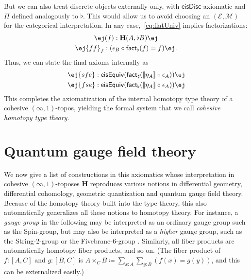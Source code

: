 \documentclass[copyright]{eptcs}
\makeatletter
\newcommand{\type}{\ensuremath{\mathsf{Type}}\xspace}
\renewcommand{\H}{\ensuremath{\mathbf{H}}\xspace}
\newcommand{\io}{\ensuremath{(\infty,1)}}
\newcommand{\E}{\ensuremath{\mathcal{E}}\xspace}
\newcommand{\M}{\ensuremath{\mathcal{M}}\xspace}
\newcommand{\factsharp}{\textsf{fact}_{\sharp}}
\newcommand{\factflat}{\textsf{fact}_{\flat}}
\def\jd#1{\@jd#1\ej}
\def\@jd#1|-#2\ej{\@@jd#1,,\;\vdash\;\left(#2\right)}
\def\@@jd#1,{\@ifmtarg{#1}{\let\next=\relax}{\left(#1\right)\let\next=\@@@jd}\next}
\def\@@@jd#1,{\@ifmtarg{#1}{\let\next=\relax}{,\,\left(#1\right)\let\next=\@@@jd}\next}
\makeatother
\begin{document}
But we can also treat discrete objects externally only, with $\mathsf{eisDisc}$ axiomatic and $\Pi$ defined analogously to $\flat$.
This would allow us %
to avoid choosing an $(\E,\M)$ for the categorical interpretation.
In any case,~\eqref{eq:flatUniv} implies factorizations:
\begin{gather*}
  \jd{\mathsf{ad}:\mathsf{eisDisc}(A), f:{\H(A,B)} |- \factflat(f):{\H(A,\flat B)}} \\
  \jd{\mathsf{ad}:\mathsf{eisDisc}(A), f:{\H(A,B)} |- \mathsf{ff}_f:(\epsilon_B \circ \factflat(f) = f)}.
\end{gather*}
Thus, we can state the final axioms internally as
\begin{gather}
  \jd{A:\sharp\type |- \mathsf{sfe}:\mathsf{eisEquiv} (\factsharp (\llbracket\eta_A\rrbracket \circ \epsilon_A))} \\
  \jd{A:\sharp\type |- \mathsf{fse}:\mathsf{eisEquiv} (\factflat (\llbracket\eta_A\rrbracket \circ \epsilon_A))}
\end{gather}
This completes the axiomatization of the internal homotopy type theory of a cohesive \io-topos, yielding the formal system that we call \emph{cohesive homotopy type theory}.






\section{Quantum gauge field theory}
\label{sec:quantum}

We now
give a list of constructions in this axiomatics
whose interpretation in cohesive
$(\infty,1)$-toposes \H reproduces various notions in differential geometry,
differential cohomology, geometric quantization and quantum gauge field theory.
Because of the homotopy theory built into the type theory, this also automatically generalizes
all these notions to homotopy theory.  For instance, a
\emph{gauge group} in the following may be interpreted as an ordinary gauge group such
as the Spin-group, but may also be interpreted as a \emph{higher} gauge
group, such as the String-2-group or the Fivebrane-6-group \cite{SSS}.
Similarly, all fiber products are automatically homotopy fiber products, and so on.
(The fiber product of $f:[A,C]$ and $g:[B,C]$ is $A\times_C B \coloneqq \sum_{x:A}\sum_{y:B}(f(x)=g(y))$, and this can be externalized easily.)
\end{document}
